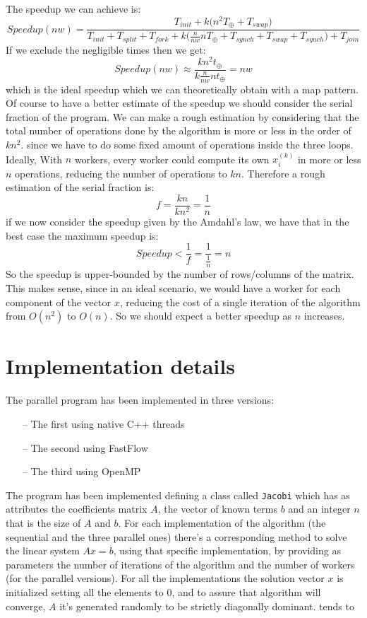 \documentclass[12pt]{article}
\begin{document}
	The speedup we can achieve is:
	\[ Speedup(nw) = \frac{T_{init} + k\Big(n^2T_\oplus + T_{swap}\Big)}{T_{init} + T_{split} + T_{fork} + k\Big(\frac{n}{nw}nT_\oplus + T_{synch} + T_{swap} + T_{synch}\Big) + T_{join}}\]
	If we exclude the negligible times then we get:
	\[ Speedup(nw) \approx \frac{kn^2t_\oplus}{k\frac{n}{nw}nt_\oplus} = nw\]
	which is the ideal speedup which we can theoretically obtain with a map pattern. Of course to have a better estimate of the speedup we should consider the serial fraction of the program. We can make a rough estimation by considering that the total number of operations done by the algorithm is more or less in the order of $kn^2$. since we have to do some fixed amount of operations inside the three loops. Ideally, With $n$ workers, every worker could compute its own $x_i^{(k)}$ in more or less $n$ operations, reducing the number of operations to $kn$. Therefore a rough estimation of the serial fraction is:
	\[ f = \frac{kn}{kn^2} = \frac{1}{n}\]
	if we now consider the speedup given by the Amdahl's law, we have that in the best case the maximum speedup is:
	\[ Speedup < \frac{1}{f} = \frac{1}{\frac{1}{n}} = n\]
	So the speedup is upper-bounded by the number of rows/columns of the matrix. This makes sense, since in an ideal scenario, we would have a worker for each component of the vector $x$, reducing the cost of a single iteration of the algorithm from $O(n^2)$ to $O(n)$. So we should expect a better speedup as $n$ increases. 
	
	\section{Implementation details}
	The parallel program has been implemented in three versions:
	\begin{itemize}
		\item[--] The first using native C++ threads 
		\item[--] The second using FastFlow
		\item[--] The third using OpenMP
	\end{itemize}
	The program has been implemented defining a class called \verb|Jacobi| which has as attributes the coefficients matrix $A$, the vector of known terms $b$ and an integer $n$ that is the size of $A$ and $b$. For each implementation of the algorithm (the sequential and the three parallel ones) there's a corresponding method to solve the linear system $Ax = b$, using that specific implementation, by providing as parameters the number of iterations of the algorithm and the number of workers (for the parallel versions). For all the implementations the solution vector $x$ is initialized setting all the elements to 0, and to assure that algorithm will converge, $A$ it's generated randomly to be strictly diagonally dominant. 
	tends to 
\end{document}
